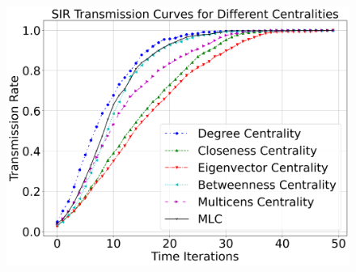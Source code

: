 \documentclass[10pt,letterpaper]{article}
\begin{document}
\begin{figure}[h!]
\begin{minipage}[b]{0.25\linewidth}
	\includegraphics[width=\textwidth]{figs/fig25-npas4_arnt-k1top2.png}
	\subcaption{}
\end{minipage}

\vspace{0.5cm}


\end{figure}
\end{document}
